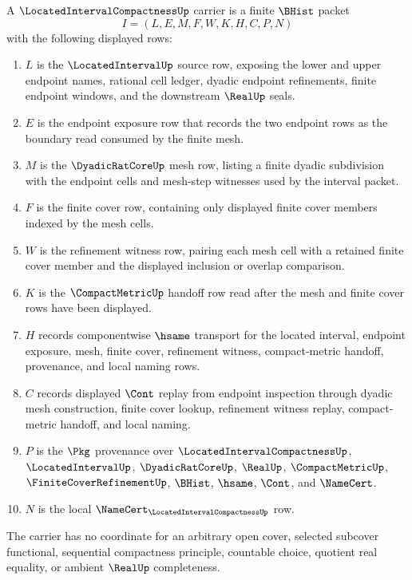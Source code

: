 \begin{definition}
\label{def:located-interval-compactness-carrier}
A $\LocatedIntervalCompactnessUp$ carrier is a finite $\BHist$ packet
$$
I=(L,E,M,F,W,K,H,C,P,N)
$$
with the following displayed rows:
\begin{enumerate}
\item $L$ is the $\LocatedIntervalUp$ source row, exposing the lower and upper endpoint names, rational cell ledger, dyadic endpoint refinements, finite endpoint windows, and the downstream $\RealUp$ seals.
\item $E$ is the endpoint exposure row that records the two endpoint rows as the boundary read consumed by the finite mesh.
\item $M$ is the $\DyadicRatCoreUp$ mesh row, listing a finite dyadic subdivision with the endpoint cells and mesh-step witnesses used by the interval packet.
\item $F$ is the finite cover row, containing only displayed finite cover members indexed by the mesh cells.
\item $W$ is the refinement witness row, pairing each mesh cell with a retained finite cover member and the displayed inclusion or overlap comparison.
\item $K$ is the $\CompactMetricUp$ handoff row read after the mesh and finite cover rows have been displayed.
\item $H$ records componentwise $\hsame$ transport for the located interval, endpoint exposure, mesh, finite cover, refinement witness, compact-metric handoff, provenance, and local naming rows.
\item $C$ records displayed $\Cont$ replay from endpoint inspection through dyadic mesh construction, finite cover lookup, refinement witness replay, compact-metric handoff, and local naming.
\item $P$ is the $\Pkg$ provenance over $\LocatedIntervalCompactnessUp$, $\LocatedIntervalUp$, $\DyadicRatCoreUp$, $\RealUp$, $\CompactMetricUp$, $\FiniteCoverRefinementUp$, $\BHist$, $\hsame$, $\Cont$, and $\NameCert$.
\item $N$ is the local $\NameCert_{\LocatedIntervalCompactnessUp}$ row.
\end{enumerate}
The carrier has no coordinate for an arbitrary open cover, selected subcover functional, sequential compactness principle, countable choice, quotient real equality, or ambient $\RealUp$ completeness.
\end{definition}


